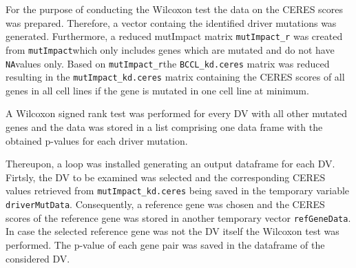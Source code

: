 \documentclass[]{article}
\newenvironment{Shaded}{\begin{snugshade}}{\end{snugshade}}
\newcommand{\CommentTok}[1]{\textcolor[rgb]{0.56,0.35,0.01}{\textit{#1}}}
\newcommand{\KeywordTok}[1]{\textcolor[rgb]{0.13,0.29,0.53}{\textbf{#1}}}
\newcommand{\NormalTok}[1]{#1}
\newcommand{\OperatorTok}[1]{\textcolor[rgb]{0.81,0.36,0.00}{\textbf{#1}}}
\newcommand{\StringTok}[1]{\textcolor[rgb]{0.31,0.60,0.02}{#1}}
\begin{document}
For the purpose of conducting the Wilcoxon test the data on the CERES
scores was prepared. Therefore, a vector containg the identified driver
mutations was generated. Furthermore, a reduced mutImpact matrix
\texttt{mutImpact\_r} was created from \texttt{mutImpact}which only
includes genes which are mutated and do not have \texttt{NA}values only.
Based on \texttt{mutImpact\_r}the \texttt{BCCL\_kd.ceres} matrix was
reduced resulting in the \texttt{mutImpact\_kd.ceres} matrix containing
the CERES scores of all genes in all cell lines if the gene is mutated
in one cell line at minimum.

\begin{Shaded}
\end{Shaded}

A Wilcoxon signed rank test was performed for every DV with all other
mutated genes and the data was stored in a list comprising one data
frame with the obtained p-values for each driver mutation.

Thereupon, a loop was installed generating an output dataframe for each
DV. Firtsly, the DV to be examined was selected and the corresponding
CERES values retrieved from \texttt{mutImpact\_kd.ceres} being saved in
the temporary variable \texttt{driverMutData}. Consequently, a reference
gene was chosen and the CERES scores of the reference gene was stored in
another temporary vector \texttt{refGeneData}. In case the selected
reference gene was not the DV itself the Wilcoxon test was performed.
The p-value of each gene pair was saved in the dataframe of the
considered DV.
\end{document}
